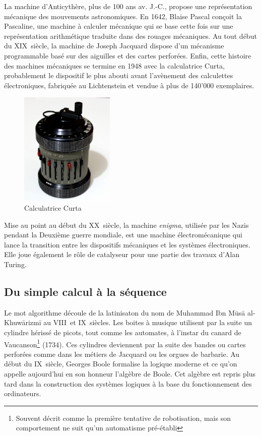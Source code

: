 \documentclass[a4paper,11pt]{book}
\begin{document}
La machine d'Anticythère, plus de 100 ans av. J.-C., propose une représentation mécanique des mouvements astronomiques. En 1642, Blaise Pascal conçoit la Pascaline, une machine à calculer mécanique qui se base cette fois sur une représentation arithmétique traduite dans des rouages mécaniques. Au tout début du \textsc{XIX}\ieme ~siècle, la machine de Joseph Jacquard dispose  d'un mécanisme programmable basé sur des aiguilles et des cartes perforées. Enfin, cette histoire des machines mécaniques se termine en 1948 avec la calculatrice Curta, probablement le dispositif le plus abouti avant l'avènement des calculettes électroniques, fabriquée au Lichtenstein et vendue à plus de 140'000 exemplaires.

\begin{figure} %
    \centering
    \includegraphics[width=0.4\textwidth]{media/machines/Curta_II_Mechanical_Calculator.jpeg}
    \caption{Calculatrice Curta}
    \centering
\end{figure}

Mise au point au début du \textsc{XX}\ieme~siècle, la machine \textit{enigma}, utilisée par les Nazis pendant la Deuxième guerre mondiale, est une machine électromécanique qui lance la transition entre les dispositifs mécaniques et les systèmes électroniques. Elle joue également le rôle de catalyseur pour une partie des travaux d'Alan Turing.
\subsection{Du simple calcul à la séquence}
Le mot algorithme découle de la latinisaton du nom de Muhammad Ibn Mūsā al-Khuwārizmī au \textsc{VIII}\ieme~et \textsc{IX}\ieme~siècles. Les boites à musique utilisent par la suite un cylindre hérissé de picots, tout comme les automates, à l'instar du canard de Vaucanson\footnote{Souvent décrit comme la première tentative de robotisation, mais son comportement ne suit qu'un automatisme pré-établi} (1734). Ces cylindres deviennent par la suite des bandes ou cartes perforées comme dans les métiers de Jacquard ou les orgues de barbarie.
Au début du \textsc{IX}\ieme~siècle, Georges Boole formalise la logique moderne et ce qu'on appelle aujourd'hui en son honneur l'algèbre de Boole. Cet algèbre est repris plus tard dans la construction des systèmes logiques à la base du fonctionnement des ordinateurs.
\end{document}
